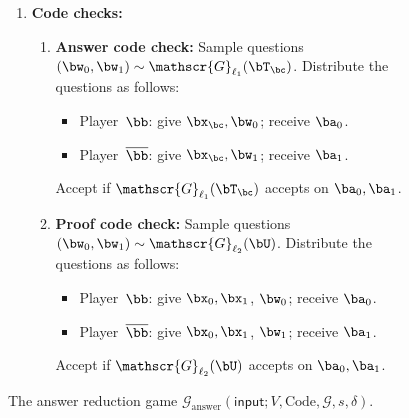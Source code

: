 \documentclass[11pt]{article}
\newcommand{\codec}{\mathrm{Code}}
\newcommand{\game}{\mathscr{G}}
\begin{document}
{\begin{figure}
\begin{enumerate}
\begin{enumerate}
\begin{itemize}
			\item[$\circ$] Player~$\bb$: give $(\bx_0, \bx_1)$, $\bT_0, \bT_1, \bU$; receive $\ba_0, \ba_1, \ba_2$.
			\item[$\circ$] Player~$\overline{\bb}$: give $\bx_0, \bx_1, \bU$; receive $\ba_{2}'$.
			\end{itemize}
		Accept if $\ba_2 = \ba_2'$.
	\end{enumerate}
	\item \textbf{Code checks:}
	\begin{enumerate}
	\item \textbf{Answer code check:}
		Sample questions $(\bw_0, \bw_1) \sim \game_{\ell_1}(\bT_{\bc})$.
		Distribute the questions as follows:
			\begin{itemize}
			\item[$\circ$] Player~$\bb$: give $\bx_{\bc}, \bw_{0}$; receive $\ba_0$.
			\item[$\circ$] Player~$\overline{\bb}$: give $\bx_{\bc}, \bw_{1}$; receive $\ba_1$.
			\end{itemize}
		Accept if $\game_{\ell_1}(\bT_{\bc})$ accepts on $\ba_0, \ba_1$.
	\item \textbf{Proof code check:}
		Sample questions $(\bw_0, \bw_1) \sim \game_{\ell_2}(\bU)$.
		Distribute the questions as follows:
			\begin{itemize}
			\item[$\circ$] Player~$\bb$: give $\bx_0, \bx_1$, $\bw_{0}$; receive $\ba_0$.
			\item[$\circ$] Player~$\overline{\bb}$: give $\bx_0, \bx_1$, $\bw_{1}$; receive $\ba_1$.
			\end{itemize}
		Accept if $\game_{\ell_2}(\bU)$ accepts on $\ba_0, \ba_1$.
	\end{enumerate}
    \end{enumerate}
    \caption{The answer reduction game $\game_{\mathrm{answer}}(\mathsf{input};V, \codec, \game, s, \delta)$.\label{fig:answer-reduction}}
  \end{figure}
}
\end{document}
